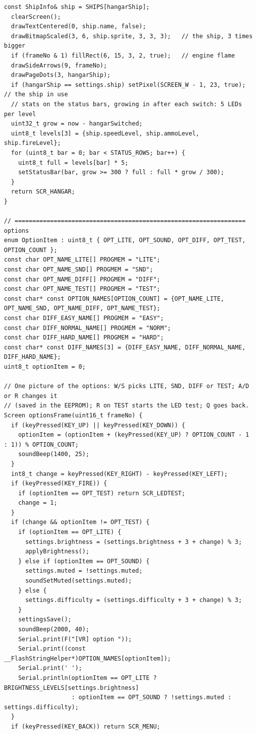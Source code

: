 \documentclass[11pt,a4paper]{article}
\begin{document}
\begin{latin}
\begin{lstlisting}[language=Arduino]
  const ShipInfo& ship = SHIPS[hangarShip];
  clearScreen();
  drawTextCentered(0, ship.name, false);
  drawBitmapScaled(3, 6, ship.sprite, 3, 3, 3);   // the ship, 3 times bigger
  if (frameNo & 1) fillRect(6, 15, 3, 2, true);   // engine flame
  drawSideArrows(9, frameNo);
  drawPageDots(3, hangarShip);
  if (hangarShip == settings.ship) setPixel(SCREEN_W - 1, 23, true);   // the ship in use
  // stats on the status bars, growing in after each switch: 5 LEDs per level
  uint32_t grow = now - hangarSwitched;
  uint8_t levels[3] = {ship.speedLevel, ship.ammoLevel, ship.fireLevel};
  for (uint8_t bar = 0; bar < STATUS_ROWS; bar++) {
    uint8_t full = levels[bar] * 5;
    setStatusBar(bar, grow >= 300 ? full : full * grow / 300);
  }
  return SCR_HANGAR;
}

// ================================================================= options
enum OptionItem : uint8_t { OPT_LITE, OPT_SOUND, OPT_DIFF, OPT_TEST, OPTION_COUNT };
const char OPT_NAME_LITE[] PROGMEM = "LITE";
const char OPT_NAME_SND[] PROGMEM = "SND";
const char OPT_NAME_DIFF[] PROGMEM = "DIFF";
const char OPT_NAME_TEST[] PROGMEM = "TEST";
const char* const OPTION_NAMES[OPTION_COUNT] = {OPT_NAME_LITE, OPT_NAME_SND, OPT_NAME_DIFF, OPT_NAME_TEST};
const char DIFF_EASY_NAME[] PROGMEM = "EASY";
const char DIFF_NORMAL_NAME[] PROGMEM = "NORM";
const char DIFF_HARD_NAME[] PROGMEM = "HARD";
const char* const DIFF_NAMES[3] = {DIFF_EASY_NAME, DIFF_NORMAL_NAME, DIFF_HARD_NAME};
uint8_t optionItem = 0;

// One picture of the options: W/S picks LITE, SND, DIFF or TEST; A/D or R changes it
// (saved in the EEPROM); R on TEST starts the LED test; Q goes back.
Screen optionsFrame(uint16_t frameNo) {
  if (keyPressed(KEY_UP) || keyPressed(KEY_DOWN)) {
    optionItem = (optionItem + (keyPressed(KEY_UP) ? OPTION_COUNT - 1 : 1)) % OPTION_COUNT;
    soundBeep(1400, 25);
  }
  int8_t change = keyPressed(KEY_RIGHT) - keyPressed(KEY_LEFT);
  if (keyPressed(KEY_FIRE)) {
    if (optionItem == OPT_TEST) return SCR_LEDTEST;
    change = 1;
  }
  if (change && optionItem != OPT_TEST) {
    if (optionItem == OPT_LITE) {
      settings.brightness = (settings.brightness + 3 + change) % 3;
      applyBrightness();
    } else if (optionItem == OPT_SOUND) {
      settings.muted = !settings.muted;
      soundSetMuted(settings.muted);
    } else {
      settings.difficulty = (settings.difficulty + 3 + change) % 3;
    }
    settingsSave();
    soundBeep(2000, 40);
    Serial.print(F("[VR] option "));
    Serial.print((const __FlashStringHelper*)OPTION_NAMES[optionItem]);
    Serial.print(' ');
    Serial.println(optionItem == OPT_LITE ? BRIGHTNESS_LEVELS[settings.brightness]
                   : optionItem == OPT_SOUND ? !settings.muted : settings.difficulty);
  }
  if (keyPressed(KEY_BACK)) return SCR_MENU;


\end{lstlisting}
\end{latin}
\end{document}
